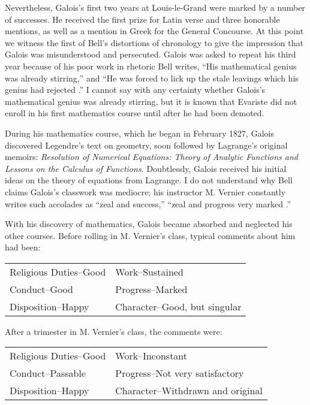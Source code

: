 \documentclass[12pt]{article}
\begin{document}
Nevertheless, Galois's first two years at Louis-le-Grand were marked by a number of successes. He received the first prize for Latin verse and three honorable mentions, as well as a mention in Greek for the General Concourse. At this point we witness the first of Bell's distortions of chronology to give the impression that Galois was misunderstood and persecuted. Galois was asked to repeat his third year because of his poor work in rhetoric Bell writes, ``His mathematical genius was already stirring,'' and ``He was forced to lick up the stale leavings which his genius had rejected \cite{17}.'' I cannot say with any certainty whether Galois's mathematical genius was already stirring, but it is known that Evariste did not enroll in his first mathematics course until after he had been demoted.

During his mathematics course, which he began in February 1827, Galois discovered Legendre's text on geometry, soon followed by Lagrange's original memoirs: \emph{Resolution of Numerical Equations: Theory of Analytic Functions and Lessons on the Calculus of Functions.} Doubtlessly, Galois received his initial ideas on the theory of equations from Lagrange. I do not understand why Bell claims Galois's classwork was mediocre; his instructor M. Vernier constantly writes such accolades as ``zeal and success,'' ``zeal and progress very marked \cite{18}.''

With his discovery of mathematics, Galois became absorbed and neglected his other courses. Before rolling in M. Vernier's class, typical comments about him had been:

\medskip
\begin{tabular}{ll}
Religious Duties--Good &Work--Sustained\\
Conduct--Good & Progress--Marked\\
Disposition--Happy & Character--Good, but singular
\end{tabular}
\medskip

\noindent
After a trimester in M. Vernier's class, the comments were:

\medskip
\begin{tabular}{ll}
Religious Duties--Good & Work--Inconstant \\
Conduct--Passable & Progress--Not very satisfactory \\
Disposition--Happy & Character--Withdrawn and original\\
\end{tabular}
\medskip
\end{document}
